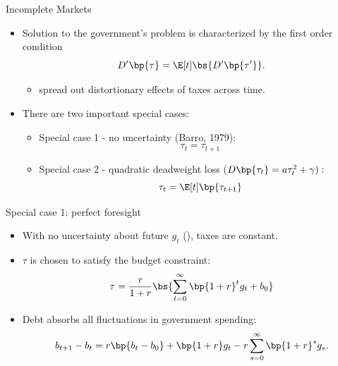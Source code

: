 \documentclass[11pt,xcolor={dvipsnames},hyperref={pdftex,pdfpagemode=UseNone,hidelinks,pdfdisplaydoctitle=true},usepdftitle=false]{beamer}
\begin{document}
    \begin{frame}{Incomplete Markets}
    
    \begin{itemize}
    \item Solution to the government's problem is characterized by the first
    order condition 
    \[ D'\bp{\tau} =\E[t]\bs{D'\bp{\tau'}} .\]       
    \vspace{-0.76cm} 
        \begin{itemize}
        \item {} spread out distortionary effects of taxes across time.
        \end{itemize}

    \item  There are two important special cases:
    \begin{itemize}
        \item Special case 1 - no uncertainty (Barro, 1979):    
             $$\tau_{t}=\tau_{t+1}$$
        \item Special case 2 - quadratic deadweight loss ($D\bp{\tau_{t}}=a\tau_{t}^{2}+\gamma):$
            $$\tau_{t}=\E[t]\bp{\tau_{t+1}}$$
    \end{itemize}
    \end{itemize}
    
    \end{frame}

    \begin{frame}{Special case 1: perfect foresight}
        \begin{itemize} 
            \item With no uncertainty about future $g_t$ (), taxes are constant.
            \item $\tau$ is chosen to satisfy the budget constraint: \[ \tau = \frac{r}{1+r} \bs{\sum_{t=0}^{\infty}\bp{1+r}^t g_t + b_0} \]
            \item Debt absorbs all fluctuations in government spending: 
            \[ b_{t+1} - b_{t} = r \bp{b_t - b_0} +  \bp{1+r}g_t - r \sum_{s=0}^{\infty}\bp{1+r}^s g_s. \]
        \end{itemize}
            
    
    \end{frame}
    
\end{document}
